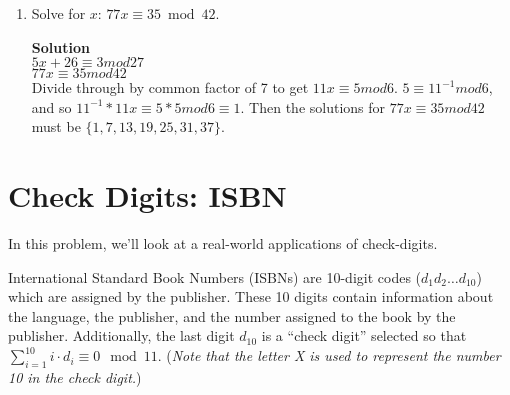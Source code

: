 \documentclass[11pt]{article}
\newcommand*{\Question}[1]{\section{#1}}
\newenvironment{Parts}{\begin{enumerate}[label=(\alph*)]}{\end{enumerate}}
\newcommand*{\Part}{\item}
\begin{document}
\begin{Parts}
\pagebreak 

  \Part Solve for $x$: $77x \equiv 35 \bmod 42$.
  \begin{mdframed} \textbf{Solution} \\
\textbf{$5x+26 \equiv 3mod27$} \\
\textbf{$77x \equiv 35mod42$}\\
Divide through by common factor of 7 to get $11x \equiv 5mod6$. $5 \equiv 11^{-1}mod6$, and so $11^{-1}*11x \equiv 5*5mod6 \equiv 1$. Then the solutions for $77x \equiv 35mod42$ must be $\{1,7,13,19,25,31,37\}$.
\end{mdframed}
  
\end{Parts}


\Question{Check Digits: ISBN} In this problem, we'll look at a real-world applications of check-digits.

International Standard Book Numbers (ISBNs) are 10-digit codes ($d_1d_2\ldots d_{10}$) which are assigned by the publisher. These 10 digits contain information about the language, the publisher, and the number assigned to the book by the publisher. Additionally, the last digit $d_{10}$ is a ``check digit'' selected so that $\sum_{i=1}^{10} i \cdot d_i \equiv 0 \mod 11$. (\textit{Note that the letter X is used to represent the number 10 in the check digit.})
\end{document}
